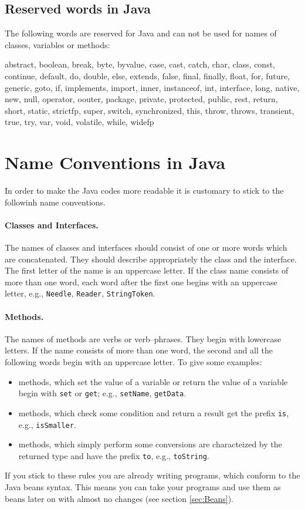 \subsection{Reserved words in Java}
The following words are reserved for Java and can not be used for names
of classes, variables or methods:
\begin{sverbatim}
abstract, boolean, break, byte, byvalue, case, cast, catch, char,
class, const, continue, default, do, double, else, extends,
false, final, finally, float, for, future, generic, goto, if,
implements, import, inner, instanceof, int, interface, long,
native, new, null, operator, oouter, package, private, protected, 
public, rest, return, short, static, strictfp, super, switch, 
synchronized, this, throw, throws, transient, true, try, var,
void, volatile, while, widefp
\end{sverbatim}


\section{Name Conventions in Java}
In order to make the Java codes more readable it is customary to stick
to the followinh name conventions.

\paragraph{Classes and Interfaces.} The names of classes and interfaces
  should consist of one or more words which are concatenated. They
  should describe appropriately the class and the interface. 
  The first letter of the name is an uppercase letter. If the
  class name consists of more than one word, each word after the first
  one begins with an uppercase letter, e.g., \verb|Needle|,
  \verb|Reader|, \verb|StringToken|.

\paragraph{Methods.} The names of methods are verbs or verb--phrases. 
  They begin with lowercase letters. If the name consists of
  more than one word, the second and all the following words begin
  with an uppercase letter. To give some examples:
\begin{itemize}
\item methods, which set the value of a variable or return the value of
  a variable begin with \verb|set| or \verb|get|; e.g.,
  \verb|setName|, \verb|getData|.
\item methods, which check some condition and return a result  get the
  prefix \verb|is|, e.g., \verb|isSmaller|.
\item methods, which simply perform some conversions are characteized
  by the returned type and have the prefix \verb|to|, e.g.,
  \verb|toString|.
\end{itemize}
If you stick to these rules you are already writing programs, which
conform to the Java beans syntax. This means you can take your
programs and use them as beans later on with almost no changes
(see section \ref{sec:Beans}).


